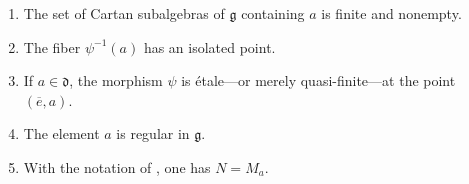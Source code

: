 \begin{theorem}
\begin{enumerate}
\begin{enumerate}
    \item[(iii)]
    The set of Cartan subalgebras of \(\mathfrak g\) containing \(a\)
    is finite and nonempty.

    \item[(iv)]
    The fiber \(\psi^{-1}(a)\) has an isolated point.

    \item[(v)]
    If \(a\in\mathfrak d\), the morphism \(\psi\) is étale---or merely
    quasi-finite---at the point \((\overline e,a)\).

    \item[(vi)]
    The element \(a\) is regular in \(\mathfrak g\).

    \item[(vii)]
    With the notation of , one has \(N=M_a\).
  \end{enumerate}
\end{enumerate}
\end{theorem}


